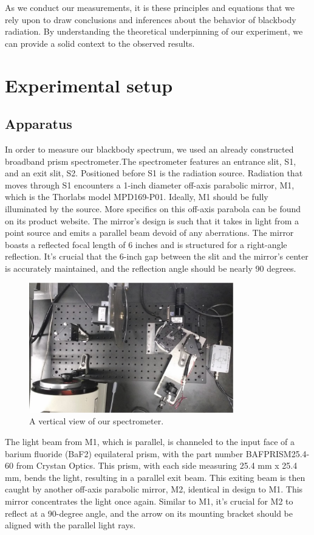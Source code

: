 \documentclass[10pt,letterpaper,onecolumn]{article}
\begin{document}
As we conduct our measurements, it is these principles and 
equations that we rely upon to draw conclusions and inferences about the 
behavior of blackbody radiation. By understanding the theoretical underpinning 
of our experiment, we can provide a solid context to the observed results.

\section{Experimental setup}
\subsection{Apparatus}
In order to measure our blackbody spectrum, we used an already constructed
broadband prism spectrometer.The spectrometer features an entrance slit, 
S1, and an exit slit, S2. 
Positioned before S1 is the radiation source. 
Radiation that moves through S1 encounters a 1-inch diameter off-axis 
parabolic mirror, M1, which is the Thorlabs model MPD169-P01. Ideally, 
M1 should be fully illuminated by the source. More specifics on this 
off-axis parabola can be found on its product website. The mirror's design 
is such that it takes in light from a point source and emits a parallel beam 
devoid of any aberrations. The mirror boasts a reflected focal length of 
6 inches and is structured for a right-angle reflection. It's crucial that 
the 6-inch gap between the slit and the mirror's center is accurately
maintained, and the reflection angle should be nearly 90 degrees.
\begin{figure}[ht]
 \begin{center}
 \includegraphics*[width=3.5in]{Apparatus_1.jpg}
 \caption{A vertical view of our spectrometer.\label{fig:apparatus_1} }
 \end{center}
\end{figure}
The light beam from M1, which is parallel, is channeled to the input 
face of a barium fluoride (BaF2) equilateral prism, with the part number 
BAFPRISM25.4-60 from Crystan Optics. This prism, with each side measuring 
25.4 mm x 25.4 mm, bends the light, resulting in a parallel exit beam. 
This exiting beam is then caught by another off-axis parabolic mirror, 
M2, identical in design to M1. This mirror concentrates the light once again. 
Similar to M1, it's crucial for M2 to reflect at a 90-degree angle,
and the arrow on its mounting bracket should be aligned with the parallel 
light rays.
\end{document}
